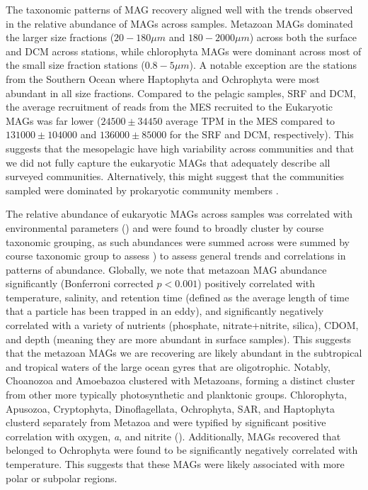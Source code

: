 \documentclass[12pt]{article}
\numberwithin{equation}{section}
\begin{document}
The taxonomic patterns of MAG recovery aligned well with the trends observed in the relative abundance of MAGs across samples. Metazoan MAGs dominated the larger size fractions ($20-180 \mu m$ and $180-2000 \mu m$) across both the surface and DCM across stations, while chlorophyta MAGs were dominant across most of the small size fraction stations ($0.8-5 \mu m$). A notable exception are the stations from the Southern Ocean where Haptophyta and Ochrophyta were most abundant in all size fractions. Compared to the pelagic samples, SRF and DCM, the average recruitment of reads from the MES recruited to the Eukaryotic MAGs was far lower ($24500 \pm 34450$ average TPM in the MES compared to $131000 \pm 104000 $ and $136000 \pm 85000$ for the SRF and DCM, respectively). This suggests that the mesopelagic have high variability across communities \citep{Pernice_2015} and that we did not fully capture the eukaryotic MAGs that adequately describe all surveyed communities. Alternatively, this might suggest that the communities sampled were dominated by prokaryotic community members \citep{Pernice_2014}.  

The relative abundance of eukaryotic MAGs across samples was correlated with environmental parameters () and were found to broadly cluster by course taxonomic grouping, as such abundances were summed across were summed by course taxonomic group to assess  ) to assess general trends and correlations in patterns of abundance. Globally, we note that metazoan MAG abundance significantly (Bonferroni corrected $p<0.001$) positively correlated with temperature, salinity, and retention time (defined as the average length of time that a particle has been trapped in an eddy), and significantly negatively correlated with a variety of nutrients (phosphate, nitrate+nitrite, silica), CDOM, and depth (meaning they are more abundant in surface samples). This suggests that the metazoan MAGs we are recovering are likely abundant in the subtropical and tropical waters of the large ocean gyres that are oligotrophic. Notably, Choanozoa and Amoebazoa clustered with Metazoans, forming a distinct cluster from other more typically photosynthetic and planktonic groups. Chlorophyta, Apusozoa, Cryptophyta, Dinoflagellata, Ochrophyta, SAR, and Haptophyta clusterd separately from Metazoa and were typified by significant positive correlation with oxygen, \textit{a}, and nitrite (). Additionally, MAGs recovered that belonged to Ochrophyta were found to be significantly negatively correlated with temperature. This suggests that these MAGs were likely associated with more polar or subpolar regions.
\end{document}
